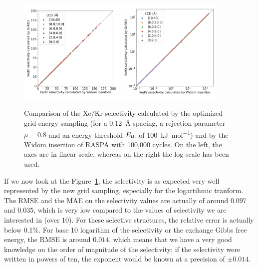 \documentclass[main]{subfiles}
\begin{document}
\begin{figure}[ht]
  \centering
    \includegraphics[width=0.45\textwidth]{figures/3-fastsim/s_0_widom_vs_s_0_grid_overview.jpg}
    \includegraphics[width=0.45\textwidth]{figures/3-fastsim/s_0_widom_vs_s_0_grid_overview_log.jpg}
    \caption{Comparison of the Xe/Kr selectivity calculated by the optimized grid energy sampling (for a \SI{0.12}{\angstrom} spacing, a rejection parameter $\mu=0.8$ and an energy threshold $E_{\text{th}}$ of \SI{100}{\kilo\joule\per\mole}) and by the Widom insertion of RASPA with 100,000 cycles. On the left, the axes are in linear scale, whereas on the right the log scale has been used. }\label{fgr:grid_widom_selectivity}
\end{figure}

If we now look at the Figure~\ref{fgr:grid_widom_selectivity}, the selectivity is as expected very well represented by the new grid sampling, especially for the logartihmic tranform. The RMSE and the MAE on the selectivity values are actually of around $0.097$ and $0.035$, which is very low compared to the values of selectivity we are interested in (over $10$). For these selective structures, the relative error is actually below {0.1\%}. For base 10 logarithm of the selectivity or the exchange Gibbs free energy, the RMSE is around $0.014$, which means that we have a very good knowledge on the order of magnitude of the selectivity; if the selectivity were written in powers of ten, the exponent would be known at a precision of $\pm 0.014$.
\end{document}

